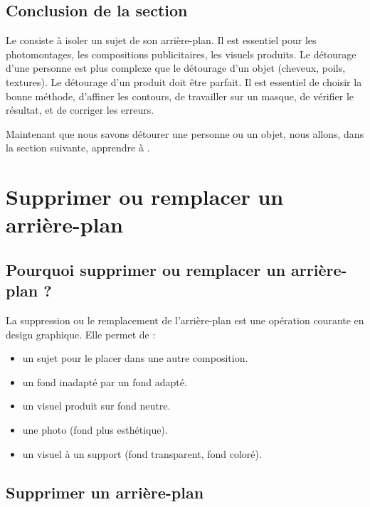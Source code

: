 \subsection*{Conclusion de la section}

Le  consiste à isoler un sujet de son arrière-plan. Il est essentiel pour les photomontages, les compositions publicitaires, les visuels produits. Le détourage d'une personne est plus complexe que le détourage d'un objet (cheveux, poils, textures). Le détourage d'un produit doit être parfait. Il est essentiel de choisir la bonne méthode, d'affiner les contours, de travailler sur un masque, de vérifier le résultat, et de corriger les erreurs.

Maintenant que nous savons détourer une personne ou un objet, nous allons, dans la section suivante, apprendre à .

\section{Supprimer ou remplacer un arrière-plan}

\subsection{Pourquoi supprimer ou remplacer un arrière-plan ?}

La suppression ou le remplacement de l'arrière-plan est une opération courante en design graphique. Elle permet de :

\begin{itemize}
    \item {} un sujet pour le placer dans une autre composition.
    \item {} un fond inadapté par un fond adapté.
    \item {} un visuel produit sur fond neutre.
    \item {} une photo (fond plus esthétique).
    \item {} un visuel à un support (fond transparent, fond coloré).
\end{itemize}

\subsection{Supprimer un arrière-plan}

